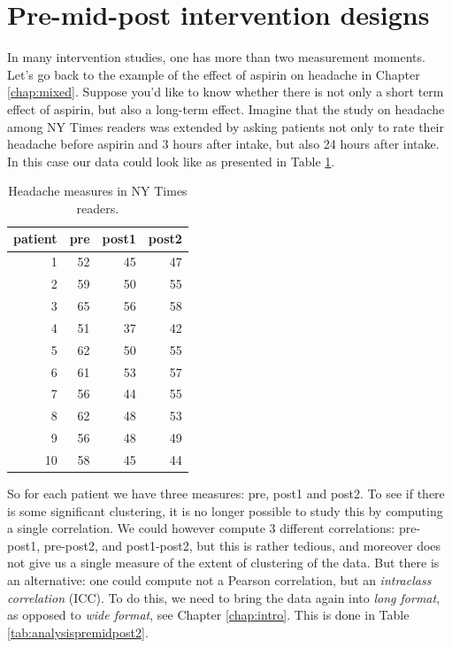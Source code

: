 \documentclass[]{report}\usepackage[]{graphicx}\usepackage[]{color}
\begin{document}
\section{Pre-mid-post intervention designs}


In many intervention studies, one has more than two measurement moments. Let's go back to the example of the effect of aspirin on headache in Chapter \ref{chap:mixed}. Suppose you'd like to know whether there is not only a short term effect of aspirin, but also a long-term effect. Imagine that the study on headache among NY Times readers was extended by asking patients not only to rate their headache before aspirin and 3 hours after intake, but also 24 hours after intake. In this case our data could look like as presented in Table \ref{tab:analysispremidpost1}.

\begin{table}[ht]
\centering
\caption{Headache measures in NY Times readers.} 
\label{tab:analysispremidpost1}
\begin{tabular}{rrrr}
  \hline
patient & pre & post1 & post2 \\ 
  \hline
1 & 52 & 45 & 47 \\ 
  2 & 59 & 50 & 55 \\ 
  3 & 65 & 56 & 58 \\ 
  4 & 51 & 37 & 42 \\ 
  5 & 62 & 50 & 55 \\ 
  6 & 61 & 53 & 57 \\ 
  7 & 56 & 44 & 55 \\ 
  8 & 62 & 48 & 53 \\ 
  9 & 56 & 48 & 49 \\ 
  10 & 58 & 45 & 44 \\ 
   \hline
\end{tabular}
\end{table}


So for each patient we have three measures: pre, post1 and post2. To see if there is some significant clustering, it is no longer possible to study this by computing a single correlation. We could however compute 3 different correlations: pre-post1, pre-post2, and post1-post2, but this is rather tedious, and moreover does not give us a single measure of the extent of clustering of the data. But there is an alternative: one could compute not a Pearson correlation, but an \textit{intraclass correlation} (ICC). To do this, we need to bring the data again into \textit{long format}, as opposed to \textit{wide format}, see Chapter \ref{chap:intro}. This is done in Table \ref{tab:analysispremidpost2}.
\end{document}
